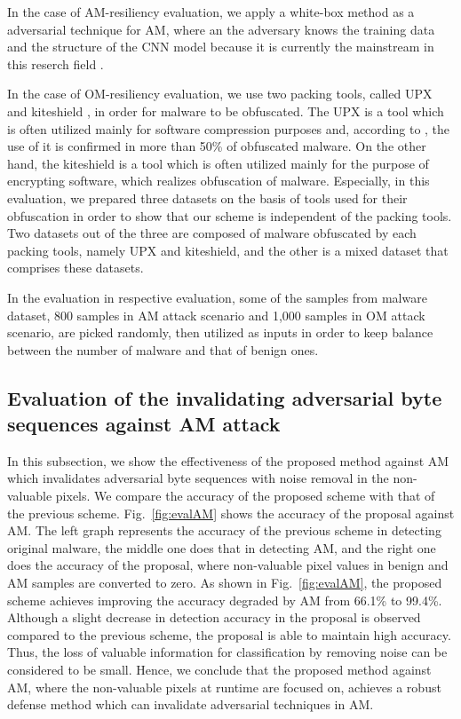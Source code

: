 \documentclass{ieeeaccess}
\newcommand{\myfigurename}{Fig.}
\begin{document}
In the case of AM-resiliency evaluation, we apply a white-box method as a adversarial technique for AM, where an the adversary knows the training data and the structure of the CNN model because it is currently the mainstream in this reserch field \cite{yamafumi, am, ae}.

In the case of OM-resiliency evaluation, we use two packing tools, called UPX \cite{upx} and kiteshield \cite{kiteshield}, in order for malware to be obfuscated.
The UPX is a tool which is often utilized mainly for software compression purposes and, according to \cite{pack_research}, the use of it is confirmed in more than 50\% of obfuscated malware. 
On the other hand, the kiteshield is a tool which is often utilized mainly for the purpose of encrypting software, which realizes obfuscation of malware.
Especially, in this evaluation, we prepared three datasets on the basis of tools used for their obfuscation in order to show that our scheme is independent of the packing tools.
Two datasets out of the three are composed of malware obfuscated by each packing tools, namely UPX and kiteshield, and the other is a mixed dataset that comprises these datasets.

In the evaluation in respective evaluation, some of the samples from malware dataset, 800 samples in AM attack scenario and 1,000 samples in OM attack scenario, are picked randomly, then utilized as inputs in order to keep balance between the number of malware and that of benign ones.

\subsection{Evaluation of the invalidating adversarial byte sequences against AM attack}
In this subsection, we show the effectiveness of the proposed method against AM which invalidates adversarial byte sequences with noise removal in the non-valuable pixels.
We compare the accuracy of the proposed scheme with that of the previous scheme.
\myfigurename~\ref{fig:evalAM} shows the accuracy of the proposal against AM.
The left graph represents the accuracy of the previous scheme in detecting original malware, the middle one does that in detecting AM, and the right one does the accuracy of the proposal, where non-valuable pixel values in benign and AM samples are converted to zero.
As shown in \myfigurename~\ref{fig:evalAM}, the proposed scheme achieves improving the accuracy degraded by AM from 66.1\% to 99.4\%.
Although a slight decrease in detection accuracy in the proposal is observed compared to the previous scheme, the proposal is able to maintain high accuracy.
Thus, the loss of valuable information for classification by removing noise can be considered to be small.
Hence, we conclude that the proposed method against AM, where the non-valuable pixels at runtime are focused on, achieves a robust defense method which can invalidate adversarial techniques in AM.
\end{document}
